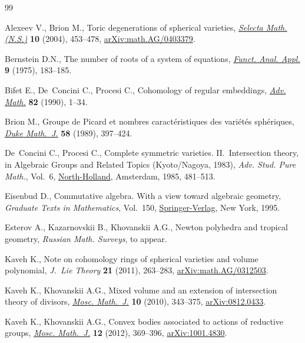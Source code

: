 \begin{thebibliography}{99}
\footnotesize\itemsep=-0.5pt

Alexeev V., Brion M., Toric degenerations of spherical varieties,
 \href{https://doi.org/10.1007/s00029-005-0396-8}{\textit{Selecta Math. (N.S.)}} \textbf{10} (2004), 453--478, \href{https://arxiv.org/abs/math.AG/0403379}{arXiv:math.AG/0403379}.

Bernstein D.N., The number of roots of a system of equations, \href{https://doi.org/10.1007/BF01075595}{\textit{Funct.
 Anal. Appl.}} \textbf{9} (1975), 183--185.

Bifet E., De~Concini C., Procesi C., Cohomology of regular embeddings,
 \href{https://doi.org/10.1016/0001-8708(90)90082-X}{\textit{Adv. Math.}} \textbf{82} (1990), 1--34.

Brion M., Groupe de {P}icard et nombres caract\'{e}ristiques des
 vari\'{e}t\'{e}s sph\'{e}riques, \href{https://doi.org/10.1215/S0012-7094-89-05818-3}{\textit{Duke Math.~J.}} \textbf{58} (1989), 397--424.

De~Concini C., Procesi C., Complete symmetric varieties. {II}.~{I}ntersection
 theory, in Algebraic Groups and Related Topics ({K}yoto/{N}agoya, 1983),
 \textit{Adv. Stud. Pure Math.}, Vol.~6, \href{https://doi.org/10.2969/aspm/00610481}{North-Holland}, Amsterdam, 1985, 481--513.

Eisenbud D., Commutative algebra. With a view toward algebraic geometry,
 \textit{Graduate Texts in Mathematics}, Vol.~150, \href{https://doi.org/10.1007/978-1-4612-5350-1}{Springer-Verlag}, New York,
 1995.

Esterov A., Kazarnovskii B., Khovanskii A.G., Newton polyhedra and tropical
 geometry, \textit{Russian Math. Surveys}, {t}o appear.

Kaveh K., Note on cohomology rings of spherical varieties and volume
 polynomial, \textit{J.~Lie Theory} \textbf{21} (2011), 263--283,
 \href{https://arxiv.org/abs/math.AG/0312503}{arXiv:math.AG/0312503}.

Kaveh K., Khovanskii A.G., Mixed volume and an extension of intersection theory
 of divisors, \href{https://doi.org/10.17323/1609-4514-2010-10-2-343-375}{\textit{Mosc. Math.~J.}} \textbf{10} (2010), 343--375,
 \href{https://arxiv.org/abs/0812.0433}{arXiv:0812.0433}.

Kaveh K., Khovanskii A.G., Convex bodies associated to actions of reductive
 groups, \href{https://doi.org/10.17323/1609-4514-2012-12-2-369-396}{\textit{Mosc. Math.~J.}} \textbf{12} (2012), 369--396, \href{https://arxiv.org/abs/1001.4830}{arXiv:1001.4830}.


\end{thebibliography}
